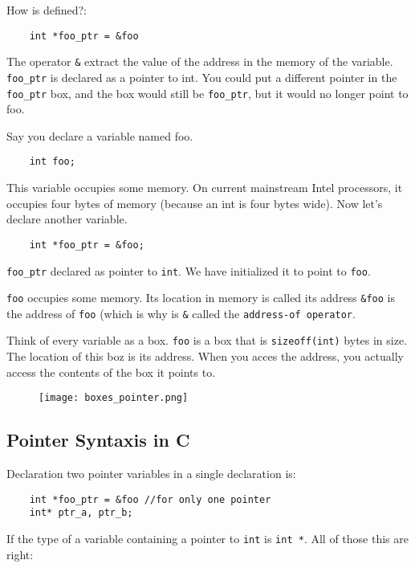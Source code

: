 \documentclass[12pt]{article}
\begin{document}
	How is defined?: 

	\begin{verbatim}
	int *foo_ptr = &foo
	\end{verbatim}

	The operator \verb|&|  extract the value of the address in the memory of
	 the variable. \verb|foo_ptr| is declared as a pointer to int. You could put
	a different pointer in the \verb|foo_ptr| box, and the
	box would still be \verb|foo_ptr|, but it would no longer point to foo.


	Say you declare a variable named foo.

	\begin{verbatim}
	int foo;
	\end{verbatim}

	This variable occupies some memory. On current mainstream Intel processors,
	it occupies four bytes of memory (because an int is four bytes wide). Now let's declare another variable.

	\begin{verbatim}
	int *foo_ptr = &foo;
	\end{verbatim}

	\verb|foo_ptr| declared as pointer to \verb|int|. We have initialized it to point to \verb|foo|.

	\verb|foo| occupies some memory. Its location in memory is called its address \verb|&foo| is
	the address of  \verb|foo| (which is why is \verb|&| called the \verb|address-of operator|.


	Think of every variable as a box. \verb|foo| is a box that is \verb|sizeoff(int)| bytes in size. The location of this boz is its address. When you acces the address, you actually access the contents of the box it points to.


	\begin{figure}[h]
	\texttt{[image: boxes\_pointer.png]}
	\centering
	\end{figure}


	\subsection{Pointer Syntaxis in C}

	Declaration two pointer variables in a single declaration is:
	\begin{verbatim}
	int *foo_ptr = &foo //for only one pointer
	int* ptr_a, ptr_b;
	\end{verbatim}

	If the type of a variable containing a pointer to \verb|int| is \verb|int *|.
	All of those this are right:
\end{document}
